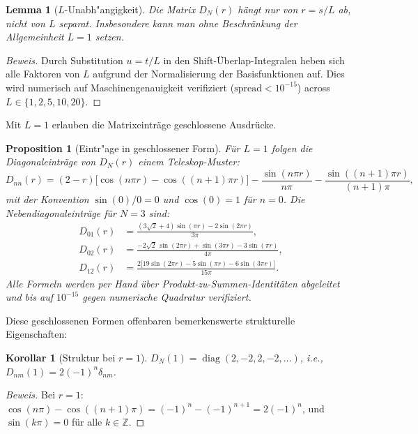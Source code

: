 \documentclass[12pt,a4paper]{article}
\newtheorem{lemma}[theorem]{Lemma}
\newtheorem{proposition}[theorem]{Proposition}
\newtheorem{corollary}[theorem]{Korollar}
\theoremstyle{definition}
\theoremstyle{remark}
\begin{document}
\begin{lemma}[$L$-Unabh"angigkeit]
\label{lem:L-indep}
Die Matrix $D_N(r)$ hängt nur von $r = s/L$ ab, nicht von $L$ separat. Insbesondere kann man ohne Beschränkung der Allgemeinheit $L = 1$ setzen.
\end{lemma}

\begin{proof}[Beweis]
Durch Substitution $u = t/L$ in den Shift-Überlap-Integralen heben sich alle Faktoren von $L$ aufgrund der Normalisierung der Basisfunktionen auf. Dies wird numerisch auf Maschinengenauigkeit verifiziert ($\text{spread} < 10^{-15}$) across $L \in \{1, 2, 5, 10, 20\}$.
\end{proof}

Mit $L=1$ erlauben die Matrixeinträge geschlossene Ausdrücke.

\begin{proposition}[Eintr"age in geschlossener Form]
\label{prop:closed-form}
Für $L = 1$ folgen die Diagonaleinträge von $D_N(r)$ einem Teleskop-Muster:
\[
  D_{nn}(r) = (2-r)\bigl[\cos(n\pi r) - \cos((n{+}1)\pi r)\bigr]
  - \frac{\sin(n\pi r)}{n\pi} - \frac{\sin((n{+}1)\pi r)}{(n{+}1)\pi},
\]
mit der Konvention $\sin(0)/0 = 0$ und $\cos(0) = 1$ für $n = 0$. Die Nebendiagonaleinträge für $N = 3$ sind:
\begin{align*}
  D_{01}(r) &= \frac{(3\sqrt{2}+4)\sin(\pi r) - 2\sin(2\pi r)}{3\pi}, \\
  D_{02}(r) &= \frac{-2\sqrt{2}\,\sin(2\pi r) + \sin(3\pi r) - 3\sin(\pi r)}{4\pi}, \\
  D_{12}(r) &= \frac{2\bigl[19\sin(2\pi r) - 5\sin(\pi r) - 6\sin(3\pi r)\bigr]}{15\pi}.
\end{align*}
Alle Formeln werden per Hand über Produkt-zu-Summen-Identitäten abgeleitet und bis auf $10^{-15}$ gegen numerische Quadratur verifiziert.
\end{proposition}

Diese geschlossenen Formen offenbaren bemerkenswerte strukturelle Eigenschaften:

\begin{corollary}[Struktur bei $r = 1$]
\label{cor:r-one}
$D_N(1) = \operatorname{diag}(2, -2, 2, -2, \ldots)$, i.e., $D_{nm}(1) = 2(-1)^n \delta_{nm}$.
\end{corollary}

\begin{proof}[Beweis]
Bei $r = 1$: $\cos(n\pi) - \cos((n{+}1)\pi) = (-1)^n - (-1)^{n+1} = 2(-1)^n$, und $\sin(k\pi) = 0$ für alle $k \in \mathbb{Z}$.
\end{proof}
\end{document}
